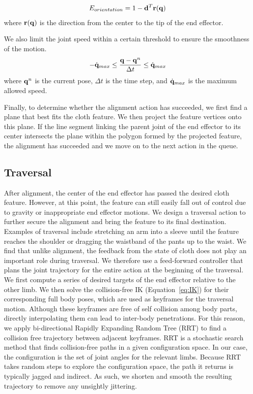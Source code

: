 \begin{equation}
  E_{orientation} = 1-\mathbf{d}^T\mathbf{r(q})
  \label{eq:orientation}
\end{equation}
where $\mathbf{r(q)}$ is the direction from the center to the tip of the end effector.

We also limit the joint speed within a certain threshold to ensure the smoothness of the motion.
\begin{equation}
  -\dot{\mathbf{q}}_{max} \leq \frac{\mathbf{q} - \mathbf{q}^n}{\Delta t} \leq \dot{\mathbf{q}}_{max}
  \label{eq:speed}
\end{equation}
where $\mathbf{q}^n$ is the current pose, $\Delta t$ is the time step, and $\dot{\mathbf{q}}_{max}$ is the maximum allowed speed.

Finally, to determine whether the alignment action has succeeded, we first find a plane that best fits the cloth feature. We then project the feature vertices onto this plane. If the line segment linking the parent joint of the end effector to its center intersects the plane within the polygon formed by the projected feature, the alignment has succeeded and we move on to the next action in the queue.


\subsection{Traversal}
After alignment, the center of the end effector has passed the desired cloth feature. However, at this point, the feature can still easily fall out of control due to gravity or inappropriate end effector motions. We design a traversal action to further secure the alignment and bring the feature to its final destination. Examples of traversal include stretching an arm into a sleeve until the feature reaches the shoulder or dragging the waistband of the pants up to the waist. We find that unlike alignment, the feedback from the state of cloth does not play an important role during traversal. We therefore use a feed-forward controller that plans the joint trajectory for the entire action at the beginning of the traversal. We first compute a series of desired targets of the end effector relative to the other limb. We then solve the collision-free IK (Equation~\ref{eq:IK}) for their corresponding full body poses, which are used as keyframes for the traversal motion. Although these keyframes are free of self collision among body parts, directly interpolating them can lead to inter-body penetrations. For this reason, we apply bi-directional Rapidly Expanding Random Tree (RRT) \cite{LaValleK:2001} to find a collision free trajectory between adjacent keyframes. RRT is a stochastic search method that finds collision-free paths in a given configuration space. In our case, the configuration is the set of joint angles for the relevant limbs. Because RRT takes random steps to explore the configuration space, the path it returns is typically jagged and indirect. As such, we shorten and smooth the resulting trajectory to remove any unsightly jittering.

